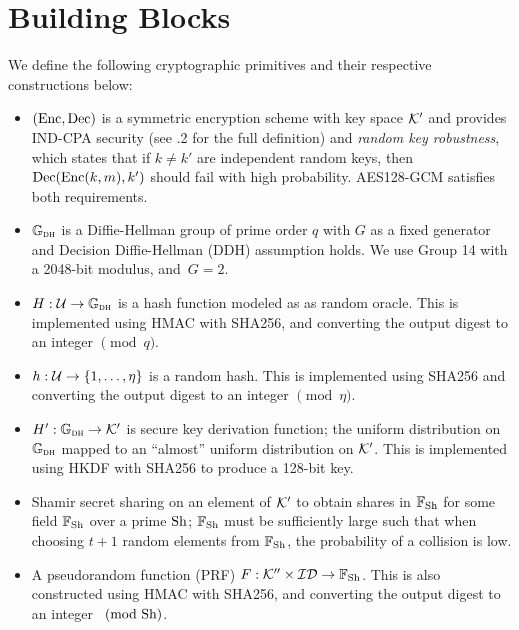 

\section{Building Blocks} %
\label{sec:building_blocks}

We define the following cryptographic primitives and their respective constructions below:
\begin{itemize}
	\item $\left(\text{Enc}, \text{Dec}\right)$ is a symmetric encryption scheme with  key space $\mathcal{K}'$ and provides IND-CPA security (see \cite{katz2014introduction} .2 for the full definition) and \emph{random key robustness}, which states that if $k \neq k'$ are independent random keys, then $\text{Dec}(\text{Enc}(k,m), k')$ should fail with high probability. AES128-GCM satisfies both requirements.



	\item $\mathbb{G}_{\textsc{dh}}$ is a Diffie-Hellman group of prime order $q$ with $G$ as a fixed generator and Decision Diffie-Hellman (DDH) assumption holds. We use Group 14 with a 2048-bit modulus, and~$G = 2$.

	\item $H : \mathcal{U} \to \mathbb{G}_{\textsc{dh}}$ is a hash function modeled as as random oracle. This is implemented using HMAC with SHA256, and converting the output digest to an integer $\pmod q$.
	\item $h : \mathcal{U} \to \left\{1,\dots,\eta\right\}$ is a random hash. This is implemented using  SHA256 and converting the output digest to an integer $\pmod \eta$.

	\item $H' : \mathbb{G}_{\textsc{dh}} \to \mathcal{K}'$ is secure key derivation function; the uniform distribution on $\mathbb{G}_{\textsc{dh}}$ mapped to an ``almost'' uniform distribution on $\mathcal{K}'$. This is implemented using HKDF with SHA256 to produce a 128-bit key.
	\item Shamir secret sharing on an element of $\mathcal{K}'$ to obtain shares in $\mathbb{F}_{\text{Sh}}$ for some field $\mathbb{F}_{\text{Sh}}$ over a prime $\text{Sh}$; $\mathbb{F}_{\text{Sh}}$ must be  sufficiently large such that when choosing $t+1$ random elements from $\mathbb{F}_{\text{Sh}}$, the probability of a collision is low.

	\item A pseudorandom function (PRF) $F : \mathcal{K}'' \times \mathcal{ID} \to \mathbb{F}_{\text{Sh}}$. This is also  constructed using HMAC with SHA256, and converting the output digest to an integer $\pmod {\text{Sh}}$.
\end{itemize}



